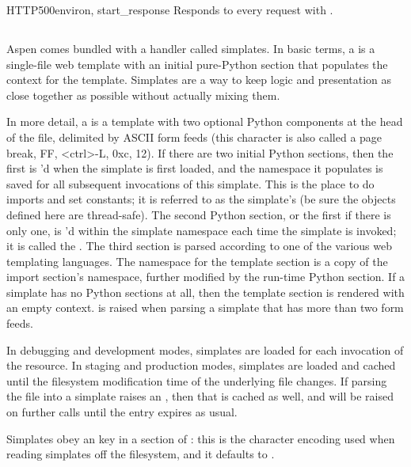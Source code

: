\begin{funcdesc}{HTTP500}{environ, start_response}
Responds to every request with .
\end{funcdesc}


\subsection{}
\label{api-handlers-simplates}

Aspen comes bundled with a handler called simplates. In basic terms, a
 is a single-file web template with an initial pure-Python section
that populates the context for the template. Simplates are a way to keep logic
and presentation as close together as possible without actually mixing them.

In more detail, a  is a template with two optional Python
components at the head of the file, delimited by ASCII form feeds (this
character is also called a page break, FF, <ctrl>-L, 0xc, 12). If there are two
initial Python sections, then the first is 'd when the simplate is
first loaded, and the namespace it populates is saved for all subsequent
invocations of this simplate. This is the place to do imports and set constants;
it is referred to as the simplate's  (be sure the objects
defined here are thread-safe). The second Python section, or the first if there
is only one, is 'd within the simplate namespace each time the
simplate is invoked; it is called the . The third
section is parsed according to one of the various web templating languages. The
namespace for the template section is a copy of the import section's namespace,
further modified by the run-time Python section. If a simplate has no Python
sections at all, then the template section is rendered with an empty context.
 is raised when parsing a simplate that has more than two
form feeds.

In debugging and development modes, simplates are loaded for each invocation of
the resource. In staging and production modes, simplates are loaded and cached
until the filesystem modification time of the underlying file changes. If
parsing the file into a simplate raises an , then that is
cached as well, and will be raised on further calls until the entry expires as
usual.

Simplates obey an  key in a \code{[simplates]} section of
: this is the character encoding used when reading simplates
off the filesystem, and it defaults to .

